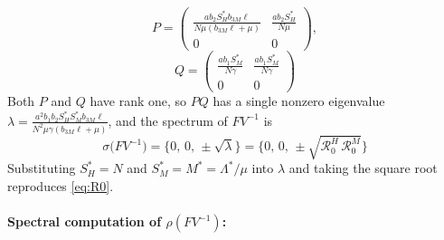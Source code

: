 \documentclass[a4paper,fleqn]{cas-dc}
\begin{document}
$$P=\begin{pmatrix}
\frac{ab_2 S_H^* b_{3M}\ell}{N\mu(b_{3M}\ell+\mu)} & \frac{ab_2 S_H^*}{N\mu}\\
0 & 0
\end{pmatrix},$$
$$Q=\begin{pmatrix}
\frac{ab_1 S_M^*}{N\gamma} & \frac{ab_1 S_M^*}{N\gamma}\\
0 & 0
\end{pmatrix}
$$
Both $P$ and $Q$ have rank one, so $PQ$ has a single nonzero eigenvalue
$\lambda=\frac{a^2 b_1 b_2 S_H^* S_M^* b_{3M}\ell}{N^2\mu\gamma(b_{3M}\ell+\mu)}$,
and the spectrum of $FV^{-1}$ is
$$
\sigma\big(FV^{-1}\big)=\Big\{0,\,0,\,\pm\sqrt{\lambda}\Big\}
=\Big\{0,\,0,\,\pm\sqrt{\mathcal{R}_0^H\,\mathcal{R}_0^M}\Big\}
$$
Substituting $S_H^*=N$ and $S_M^*=M^*=\Lambda^*/\mu$ into $\lambda$ and taking
the square root reproduces \eqref{eq:R0}.

\paragraph{Spectral computation of $\rho(FV^{-1})$:}
\label{app:eigen}
\end{document}
